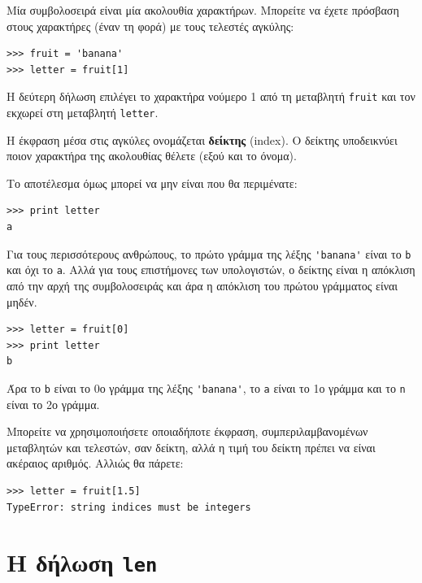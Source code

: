 \documentclass[10pt]{book}
\begin{document}
Μία συμβολοσειρά είναι μία ακολουθία χαρακτήρων.
Μπορείτε να έχετε πρόσβαση στους χαρακτήρες (έναν τη φορά) με τους
τελεστές αγκύλης:

\begin{verbatim}
>>> fruit = 'banana'
>>> letter = fruit[1]
\end{verbatim}
%

Η δεύτερη δήλωση επιλέγει το χαρακτήρα νούμερο 1 από τη μεταβλητή 
{\tt fruit} και τον εκχωρεί στη μεταβλητή {\tt letter}.

Η έκφραση μέσα στις αγκύλες ονομάζεται {\bf δείκτης} (index). 
Ο δείκτης υποδεικνύει ποιον χαρακτήρα της ακολουθίας θέλετε (εξού και το όνομα).

Το αποτέλεσμα όμως μπορεί να μην είναι που θα περιμένατε:

\begin{verbatim}
>>> print letter
a
\end{verbatim}
%

Για τους περισσότερους ανθρώπους, το πρώτο γράμμα της λέξης \verb"'banana'"
είναι το {\tt b} και όχι το {\tt a}. Αλλά για τους επιστήμονες των υπολογιστών,
ο δείκτης είναι η απόκλιση από την αρχή της συμβολοσειράς και άρα η απόκλιση του πρώτου γράμματος είναι μηδέν.  

\begin{verbatim}
>>> letter = fruit[0]
>>> print letter
b
\end{verbatim}
%

Άρα το {\tt b} είναι το 0ο γράμμα της λέξης \verb"'banana'", το
{\tt a} είναι το 1ο γράμμα και το {\tt n} είναι το 2ο γράμμα.

Μπορείτε να χρησιμοποιήσετε οποιαδήποτε έκφραση, συμπεριλαμβανομένων μεταβλητών και τελεστών, σαν δείκτη, αλλά η τιμή του δείκτη πρέπει να είναι ακέραιος αριθμός. Αλλιώς θα πάρετε:

\begin{verbatim}
>>> letter = fruit[1.5]
TypeError: string indices must be integers
\end{verbatim}
%


\section{Η δήλωση \tt len}
\end{document}
